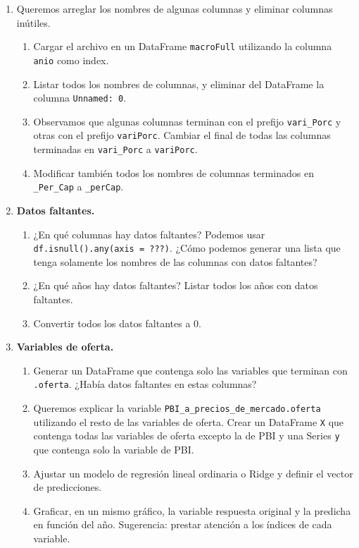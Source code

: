 \documentclass[a4paper,11pt]{article}
\theoremstyle{definition}
\begin{document}
\begin{enumerate}[resume]
\item Queremos arreglar los nombres de algunas columnas y eliminar columnas inútiles.
\begin{enumerate}
\item Cargar el archivo en un DataFrame \lstinline{macroFull} utilizando la columna \lstinline{anio} como index.
\item Listar todos los nombres de columnas, y eliminar del DataFrame la columna \lstinline{Unnamed: 0}.
\item Observamos que algunas columnas terminan con el prefijo \lstinline{vari_Porc} y otras con el prefijo \lstinline{variPorc}. Cambiar el final de todas las columnas terminadas en \lstinline{vari_Porc} a \lstinline{variPorc}.
\item Modificar también todos los nombres de columnas terminados en \lstinline{_Per_Cap} a \lstinline{_perCap}.
\end{enumerate}

\item \textbf{Datos faltantes.}
\begin{enumerate}
\item ¿En qué columnas hay datos faltantes? Podemos usar \lstinline{df.isnull().any(axis = ???)}. ¿Cómo podemos generar una lista que tenga solamente los nombres de las columnas con datos faltantes?
\item ¿En qué años hay datos faltantes? Listar todos los años con datos faltantes.
\item Convertir todos los datos faltantes a 0.
\end{enumerate}

\item \textbf{Variables de oferta.}
\begin{enumerate}
\item Generar un DataFrame que contenga solo las variables que terminan con \lstinline{.oferta}. ¿Había datos faltantes en estas columnas?
\item Queremos explicar la variable \lstinline{PBI_a_precios_de_mercado.oferta} utilizando el resto de las variables de oferta. Crear un DataFrame \lstinline{X} que contenga todas las variables de oferta excepto la de PBI y una Series \lstinline{y} que contenga solo la variable de PBI.
\item Ajustar un modelo de regresión lineal ordinaria o Ridge y definir el vector de predicciones.
\item Graficar, en un mismo gráfico, la variable respuesta original y la predicha en función del año. Sugerencia: prestar atención a los índices de cada variable.
\end{enumerate}

\end{enumerate}
\end{document}

